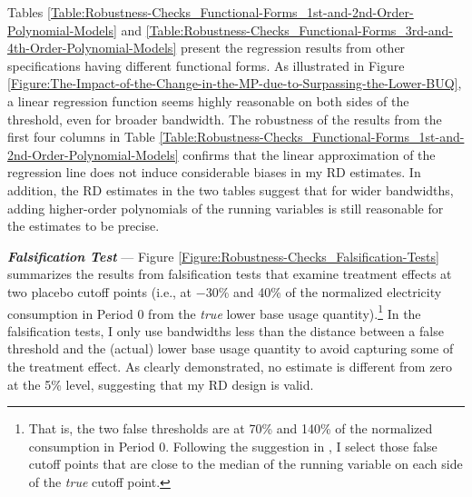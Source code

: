 Tables \ref{Table:Robustness-Checks_Functional-Forms_1st-and-2nd-Order-Polynomial-Models} and \ref{Table:Robustness-Checks_Functional-Forms_3rd-and-4th-Order-Polynomial-Models} present the regression results from other specifications having different functional forms. As illustrated in Figure \ref{Figure:The-Impact-of-the-Change-in-the-MP-due-to-Surpassing-the-Lower-BUQ}, a linear regression function seems highly reasonable on both sides of the threshold, even for broader bandwidth. The robustness of the results from the first four columns in Table \ref{Table:Robustness-Checks_Functional-Forms_1st-and-2nd-Order-Polynomial-Models} confirms that the linear approximation of the regression line does not induce considerable biases in my RD estimates. In addition, the RD estimates in the two tables suggest that for wider bandwidths, adding higher-order polynomials of the running variables is still reasonable for the estimates to be precise.


\par \vspace{0.5cm}
\noindent
\textit{\textbf{Falsification Test}} ---
Figure \ref{Figure:Robustness-Checks_Falsification-Tests} summarizes the results from falsification tests that examine treatment effects at two placebo cutoff points (i.e., at $-$30\% and 40\% of the normalized electricity consumption in Period 0 from the \textit{true} lower base usage quantity).\footnote{That is, the two false thresholds are at 70\% and 140\% of the normalized consumption in Period 0. Following the suggestion in \cite{Regression-Discontinuity-Designs_A-Guide-to-Practice_Imbens-and-Lemieux_2008}, I select those false cutoff points that are close to the median of the running variable on each side of the \textit{true} cutoff point.} In the falsification tests, I only use bandwidths less than the distance between a false threshold and the (actual) lower base usage quantity to avoid capturing some of the treatment effect. As clearly demonstrated, no estimate is different from zero at the 5\% level, suggesting that my RD design is valid. 

